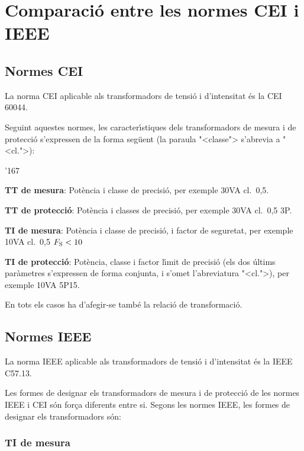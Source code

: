 \section{Comparaci\'{o} entre les normes CEI i
IEEE}\label{sec:comp_tt_ti_cei_ieee}

\subsection{Normes CEI}

La norma \textsf{CEI} aplicable als transformadors de tensi\'{o} i
d'intensitat \'{e}s la \textsf{CEI 60044}.

Seguint aquestes normes, les caracter\'{\i}stiques dels transformadors de
mesura i de protecci\'{o} s'expressen de la forma seg\"{u}ent (la paraula
{"<}classe{">} s'abrevia a {"<}cl.{">}):
\begin{dinglist}{'167}
   \item \textbf{TT de mesura}: Pot\`{e}ncia i classe de precisi\'{o}, per
   exemple 30\unit{VA} cl.~0,5.
   \item \textbf{TT de protecci\'{o}}: Pot\`{e}ncia i classes de precisi\'{o}, per
   exemple 30\unit{VA} cl.~0,5 3P.
   \item \textbf{TI de mesura}: Pot\`{e}ncia i classe de precisi\'{o}, i factor de seguretat, per
   exemple 10\unit{VA} cl.~0,5 $F_\mathrm{S}<10$
   \item \textbf{TI de protecci\'{o}}: Pot\`{e}ncia, classe i factor l\'{\i}mit de precisi\'{o}
    (els dos \'{u}ltims par\`{a}metres s'expressen de forma conjunta, i s'omet l'abreviatura {"<}cl.{">}),
     per exemple 10\unit{VA} 5P15.
\end{dinglist}

En tots els casos ha d'afegir-se tamb\'{e} la relaci\'{o} de transformaci\'{o}.

\subsection{Normes IEEE}

La norma \textsf{IEEE} aplicable als transformadors de tensi\'{o} i
d'intensitat \'{e}s la \textsf{IEEE C57.13}.

Les formes de designar els transformadors  de mesura i de protecci\'{o}
de les normes \textsf{IEEE} i \textsf{CEI} s\'{o}n for\c{c}a diferents
entre si. Segons les normes \textsf{IEEE},  les formes de designar
els transformadors s\'{o}n:

\subsubsection{TI de mesura}

